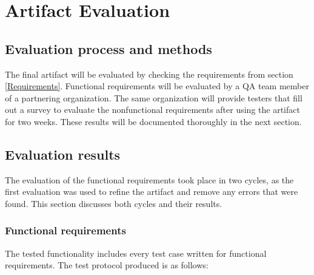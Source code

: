 
\chapter{Artifact Evaluation} 

\label{Chapter6} 

\section{Evaluation process and methods}

The final artifact will be evaluated by checking the requirements from section \ref{Requirements}. Functional requirements will be evaluated by a QA team member of a partnering organization. The same organization will provide testers that fill out a survey to evaluate the nonfunctional requirements after using the artifact for two weeks. These results will be documented thoroughly in the next section.

\section{Evaluation results}

The evaluation of the functional requirements took place in two cycles, as the first evaluation was used to refine the artifact and remove any errors that were found. This section discusses both cycles and their results.

\subsection{Functional requirements}

The tested functionality includes every test case written for functional requirements. The test protocol produced is as follows:

